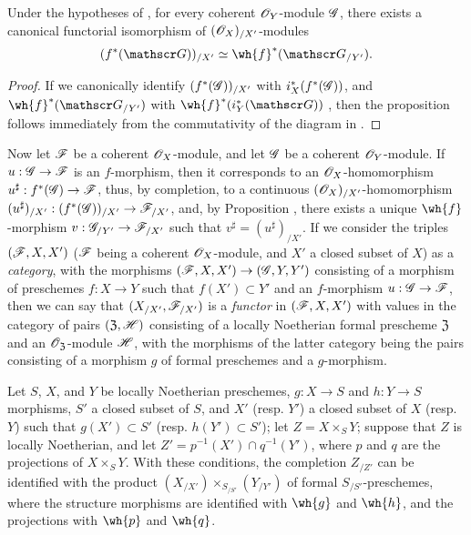 \begin{proposition}[10.9.5]
\label{1.10.9.5}
Under the hypotheses of , for every coherent $\mathscr{O}_Y$-module $\mathscr{G}$, there exists a canonical functorial isomorphism of $(\mathscr{O}_X)_{/X'}$-modules
\[
  (f^*(\sh{G}))_{/X'}\isoto\wh{f}^*(\sh{G}_{/Y'}).
\]
\end{proposition}

\begin{proof}
\label{proof-1.10.9.5}
If we canonically identify $(f^*(\mathscr{G}))_{/X'}$ with $i_X^*(f^*(\mathscr{G}))$, and $\wh{f}^*(\sh{G}_{/Y'})$ with $\wh{f}^*(i_Y^*(\sh{G}))$ , then the proposition follows immediately from the commutativity of the diagram in .
\end{proof}

\begin{env}[10.9.6]
\label{1.10.9.6}
Now let $\mathscr{F}$ be a coherent $\mathscr{O}_X$-module, and let $\mathscr{G}$ be a coherent $\mathscr{O}_Y$-module.
If $u:\sh{G}\to\sh{F}$ is an $f$-morphism, then it corresponds to an $\mathscr{O}_X$-homomorphism $u^\sharp:f^*(\sh{G})\to\sh{F}$, thus, by completion, to a continuous $(\mathscr{O}_X)_{/X'}$-homomorphism $(u^\sharp)_{/X'}:(f^*(\sh{G}))_{/X'}\to\sh{F}_{/X'}$, and, by Proposition , there exists a unique $\wh{f}$-morphism $v:\sh{G}_{/Y'}\to\sh{F}_{/X'}$
such that $v^\sharp=(u^\sharp)_{/X'}$.
If we consider the triples $(\mathscr{F},X,X')$ ($\mathscr{F}$ being a coherent $\mathscr{O}_X$-module, and $X'$ a closed subset of $X$) as a \emph{category}, with the morphisms $(\sh{F},X,X')\to(\sh{G},Y,Y')$ consisting of a morphism of preschemes $f:X\to Y$ such that $f(X')\subset Y'$ and an $f$-morphism $u:\sh{G}\to\sh{F}$, then we can say that $(X_{/X'},\mathscr{F}_{/X'})$ is a \emph{functor} in $(\mathscr{F},X,X')$ with values in the category of pairs $(\mathfrak{Z},\mathscr{H})$ consisting of a locally Noetherian formal prescheme $\mathfrak{Z}$ and an $\mathscr{O}_\mathfrak{Z}$-module $\mathscr{H}$, with the morphisms of the latter category being the pairs consisting of a morphism $g$ of formal preschemes and a $g$-morphism.
\end{env}

\begin{proposition}[10.9.7]
\label{1.10.9.7}
Let $S$, $X$, and $Y$ be locally Noetherian preschemes, $g:X\to S$ and $h:Y\to S$ morphisms, $S'$ a closed subset of $S$, and $X'$ (resp. $Y'$) a closed subset of $X$ (resp. $Y$) such that $g(X')\subset S'$ (resp. $h(Y')\subset S'$); let $Z=X\times_S Y$; suppose that $Z$ is locally Noetherian, and let $Z'=p^{-1}(X')\cap q^{-1}(Y')$, where $p$ and $q$ are the projections of $X\times_S Y$.
With these conditions, the completion $Z_{/Z'}$ can be identified with the product $(X_{/X'})\times_{S_{/S'}}(Y_{/Y'})$ of formal $S_{/S'}$-preschemes, where the structure morphisms are identified with $\wh{g}$ and $\wh{h}$, and the projections with $\wh{p}$ and $\wh{q}$.
\end{proposition}

